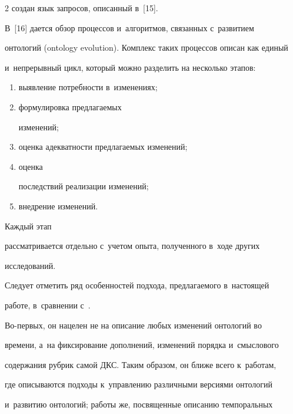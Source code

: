 \begin{multicols}{2}
создан язык запросов, описанный в~[15].





В~[16] дается обзор процессов и~алгоритмов, связанных с~развитием 


онтологий (ontology evolution). Комплекс таких процессов описан как единый 


и~непрерывный цикл, который можно разделить на несколько этапов: 





\begin{enumerate}[(1)]


\item выявление потребности в~изменениях; 


\item формулировка предлагаемых 


изменений; 


\item оценка адекватности предлагаемых изменений; 


\item оценка 


последствий реализации изменений; 


\item внедрение изменений.


\end{enumerate}





 Каждый этап 


рассматривается отдельно с~учетом опыта, полученного в~ходе других 


исследований.





Следует отметить ряд особенностей подхода, предлагаемого в~настоящей 


работе, в~сравнении с~\cite{12-gon, 13-gon, 14-gon, 15-gon, 16-gon}.  


Во-пер\-вых, он нацелен не на описание любых изменений онтологий во 


времени, а~на фиксирование дополнений, изменений порядка и~смыслового 


содержания рубрик самой ДКС. Таким образом, он ближе всего к~работам, 


где описываются подходы к~управлению различными версиями онтологий 


и~развитию онтологий; работы же, посвященные описанию темпоральных 



\end{multicols}
